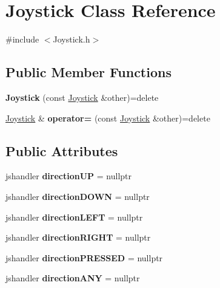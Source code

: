 \hypertarget{class_joystick}{}\section{Joystick Class Reference}
\label{class_joystick}


{\ttfamily \#include $<$Joystick.\+h$>$}

\subsection*{Public Member Functions}
\begin{DoxyCompactItemize}
\item 
\mbox{\label{class_joystick_aee767adfa96c50ebb6ca1af13ddb6187}} 
{\bfseries Joystick} (const \mbox{\hyperlink{class_joystick}{Joystick}} \&other)=delete
\item 
\mbox{\label{class_joystick_ad5b1112a556aba93875e60e70a2f6643}} 
\mbox{\hyperlink{class_joystick}{Joystick}} \& {\bfseries operator=} (const \mbox{\hyperlink{class_joystick}{Joystick}} \&other)=delete
\end{DoxyCompactItemize}
\subsection*{Public Attributes}
\begin{DoxyCompactItemize}
\item 
\mbox{\label{class_joystick_a24b286e28a1e3ada2bc42c4b1ef16339}} 
jshandler {\bfseries direction\+UP} = nullptr
\item 
\mbox{\label{class_joystick_aca32b8875e35bd9af63065e0d5dfafb9}} 
jshandler {\bfseries direction\+D\+O\+WN} = nullptr
\item 
\mbox{\label{class_joystick_a0a7fa96faefa92d2f2e09251b460b5ed}} 
jshandler {\bfseries direction\+L\+E\+FT} = nullptr
\item 
\mbox{\label{class_joystick_a6fcd661de0e47977ebfddd1950004bd1}} 
jshandler {\bfseries direction\+R\+I\+G\+HT} = nullptr
\item 
\mbox{\label{class_joystick_ab7b8181af7f4b77fe567c9fe2b00cf89}} 
jshandler {\bfseries direction\+P\+R\+E\+S\+S\+ED} = nullptr
\item 
\mbox{\label{class_joystick_a9699d1491b81b53353a30cfc675ef188}} 
jshandler {\bfseries direction\+A\+NY} = nullptr
\end{DoxyCompactItemize}
